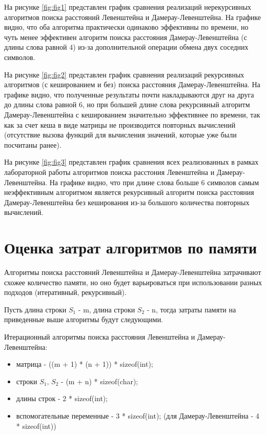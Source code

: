 На рисунке \ref{fig:fig1} представлен график сравнения реализаций нерекурсивных алгоритмов поиска расстояний Левенштейна и Дамерау-Левенштейна. На графике видно, что оба алгоритма практически одинаково эффективны по времени, но чуть менее эффективен алгоритм поиска расстояния Дамерау-Левенштейна (с длины слова равной 4) из-за дополнительной операции обмена двух соседних символов.


На рисунке \ref{fig:fig2} представлен график сравнения реализаций рекурсивных алгоритмов (с кешированием и без) поиска расстояния Дамерау-Левенштейна. На графике видно, что полученные результаты почти накладываются друг на друга до длины слова равной 6, но при большей длине слова рекурсивный алгоритм Дамерау-Левенштейна с кешированием значительно эффективнее по времени, так как за счет кеша в виде матрицы не производится повторных вычислений (отсутствие вызова функций для вычисления значений, которые уже были посчитаны ранее).


На рисунке \ref{fig:fig3} представлен график сравнения всех реализованных в рамках лабораторной работы алгоритмов поиска расстония Левенштейна и Дамерау-Левенштейна. На графике видно, что при длине слова больше 6 символов самым неэффективным алгоритмом является рекурсивный алгоритм поиска расстояния Дамерау-Левенштейна без кеширования из-за большого количества повторных вычислений.

\section{Оценка затрат алгоритмов по памяти}

Алгоритмы поиска расстояний Левенштейна и Дамерау-Левенштейна затрачивают схожее количество памяти, но оно будет варьироваться при использовании разных подходов (итеративный, рекурсивный).

Пусть длина строки $S_1$ - m, длина строки $S_2$ - n, тогда затраты памяти на приведенные выше алгоритмы будут следующими.

Итерационный алгоритмы поиска расстояния Левенштейна и Дамерау-Левенштейна:\\
\begin{itemize}
\item матрица - ((m + 1) * (n + 1)) * sizeof(int); 
\item строки $S_1$, $S_2$ - (m + n) * sizeof(char); 
\item длины строк - 2 * sizeof(int); 
\item вспомогательные переменные -  3 * sizeof(int); (для Дамерау-Левенштейна - 4 * sizeof(int))
\end{itemize}

